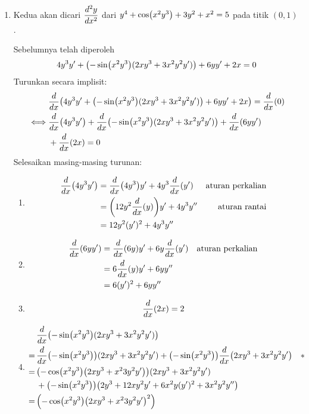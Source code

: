 \begin{enumerate}[leftmargin=*, label={\arabic*}.]
\begin{enumerate}[label={\alph*}.]
    \item Kedua akan dicari $\displaystyle\frac{d^{2}y}{dx^{2}}$ dari 
    $y^{4}+\cos\brk*{x^{2}y^{3}}+3y^{2}+x^{2}=5$ pada titik $(0,1)$.

    Sebelumnya telah diperoleh
    \[
    4y^{3}y'+\brk*{-\sin\brk*{x^{2}y^{3}}(2xy^{3}+3x^{2}y^{2}y')}+6yy'+2x=0
    \]
    Turunkan secara implisit:
    \begin{align*}
        &\drv{x}{4y^{3}y'
        +\brk*{-\sin\brk*{x^{2}y^{3}}(2xy^{3}+3x^{2}y^{2}y')}+6yy'+2x}=
        \drv{x}{0}\\
        \iff &\drv{x}{4y^{3}y'}+\drv{x}{-\sin\brk*{x^{2}y^{3}}(2xy^{3}+3x^{2}y^{2}y')}
        +\drv{x}{6yy'}\\
        &+\drv{x}{2x}=0
    \end{align*}
    Selesaikan masing-masing turunan:
    \begin{enumerate}[label={\arabic*})]
    \item \begin{align*}
        \drv{x}{4y^{3}y'} &= \drv{x}{4y^{3}}y' + 4y^{3}\drv{x}{y'}
        &\text{aturan perkalian}\\
        &=\brk*{12y^{2}\drv{x}{y}}y'+4y^{3}y''
        &\text{aturan rantai}\\
        &=12y^{2}(y')^{2}+4y^{3}y''
    \end{align*}
    \item \begin{align*}
        \drv{x}{6yy'} &= \drv{x}{6y}y'+6y\drv{x}{y'}
        &\text{aturan perkalian}\\
        &=6\drv{x}{y}y'+6yy'' \\
        &= 6(y')^{2}+6yy''
    \end{align*}
    \item \[
    \drv{x}{2x} = 2
    \]
    \item \begin{align*}
        &\drv{x}{-\sin\brk*{x^{2}y^{3}}(2xy^{3}+3x^{2}y^{2}y')}\\
        =\,&\drv{x}{-\sin\brk*{x^{2}y^{3}}}(2xy^{3}+3x^{2}y^{2}y')
        +\brk*{-\sin\brk*{x^{2}y^{3}}}\drv{x}{2xy^{3}+3x^{2}y^{2}y'}
        \quad *\\
        =\,&\brk*{-\cos\brk*{x^{2}y^{3}}\brk*{2xy^{3}+x^{2}3y^{2}y'}}
        (2xy^{3}+3x^{2}y^{2}y')\\
        &+\brk*{-\sin\brk*{x^{2}y^{3}}}
        \brk*{2y^{3}+12xy^{2}y'+6x^{2}y(y')^{2}+3x^{2}y^{2}y''}\\
        =\,&\brk*{-\cos\brk*{x^{2}y^{3}}\brk*{2xy^{3}+x^{2}3y^{2}y'}^{2}}

\end{align*}
\end{enumerate}
\end{enumerate}
\end{enumerate}
